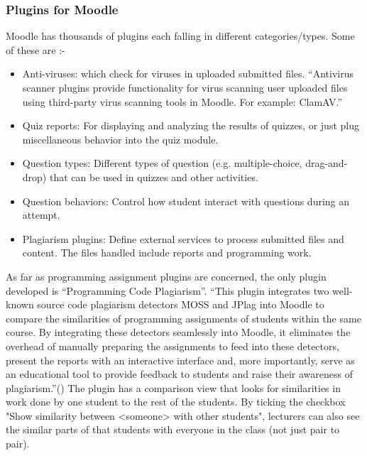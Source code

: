 \documentclass[12pt]{article}
\begin{document}
		 \subsubsection{Plugins for Moodle}
		 Moodle has thousands of plugins each falling in different categories/types. Some of these are :- 
		 \begin{itemize}
			\item Anti-viruses: which check for viruses in uploaded submitted files. “Antivirus scanner plugins provide 						functionality for virus scanning user uploaded files using third-party virus scanning tools in Moodle. For 				example: ClamAV.” 
			\item  Quiz reports: For displaying and analyzing the results of quizzes, or just plug miscellaneous behavior 					into the quiz module.
			\item Question types: Different types of question (e.g. multiple-choice, drag-and-drop) that can be used in 					quizzes and other activities.
			\item Question behaviors: Control how student interact with questions during an attempt.
			\item Plagiarism plugins: Define external services to process submitted files and content. The files handled 						include reports and programming work.
		\end{itemize}
		As far as programming assignment plugins are concerned, the only plugin developed is “Programming Code 				Plagiarism”. “This plugin integrates two well-known source code plagiarism detectors MOSS and JPlag into Moodle to 			compare the similarities of programming assignments of students within the same course. By integrating these 				detectors seamlessly into Moodle, it eliminates the overhead of manually preparing the assignments to feed into 				these detectors, present the reports with an interactive interface and, more importantly, serve as an educational 			tool to provide feedback to students and raise their awareness of plagiarism.”() The plugin has a comparison view 			that looks for similarities in work done by one student to the rest of the students. By ticking the checkbox "Show 				similarity between <someone> with other students", lecturers can also see the similar parts of that students with 			everyone in the class (not just pair to pair).
\end{document}
